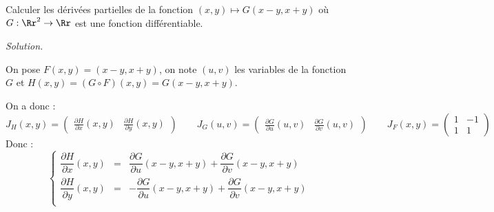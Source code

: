 \documentclass[11pt, class=report,crop=false]{standalone}
\begin{document}
\begin{exemple}
Calculer les dérivées partielles de la fonction $(x,y) \mapsto G(x-y,x+y)$ où 
$G : \Rr^2 \to \Rr$ est une fonction différentiable.

\bigskip
\emph{Solution.}

On pose $F(x,y) = (x-y,x+y)$, on note $(u,v)$ les variables de la fonction $G$ et $H(x,y) = (G \circ F)(x,y)
= G(x-y,x+y)$.

On a donc :
$$J_H(x,y) = \begin{pmatrix} \frac{\partial H}{\partial x}(x,y)
&  \frac{\partial H}{\partial y}(x,y) \end{pmatrix} \qquad
J_G(u,v) = \begin{pmatrix} \frac{\partial G}{\partial u}(u,v)
&  \frac{\partial G}{\partial v}(u,v) \end{pmatrix}\qquad
J_F(x,y) = \begin{pmatrix} 
1 &  -1 \\
1 &  1
\end{pmatrix}
$$
Donc :
$$
\left\{\begin{array}{rcl}
\dfrac{\partial H}{\partial x}(x,y) &=& 
\dfrac{\partial G}{\partial u}(x-y,x+y) + \dfrac{\partial G}{\partial v}(x-y,x+y) \\[2ex]
\dfrac{\partial H}{\partial y}(x,y) &=& 
-\dfrac{\partial G}{\partial u}(x-y,x+y) + \dfrac{\partial G}{\partial v}(x-y,x+y) \\
\end{array}\right.
$$
\end{exemple}

\bigskip
{}
\end{document}

